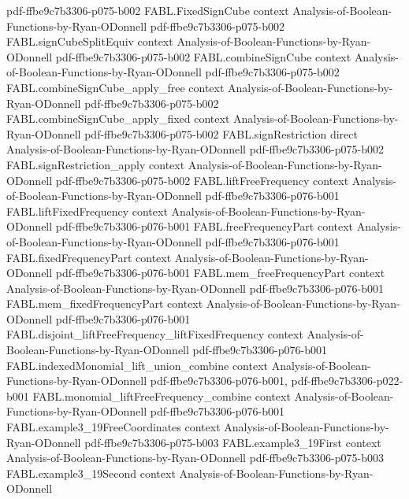 \begin{theorem}
  {pdf-ffbe9c7b3306-p075-b002}
\proofstep
  {FABL.FixedSignCube}
  {context}
  {Analysis-of-Boolean-Functions-by-Ryan-ODonnell}
  {pdf-ffbe9c7b3306-p075-b002}
\proofstep
  {FABL.signCubeSplitEquiv}
  {context}
  {Analysis-of-Boolean-Functions-by-Ryan-ODonnell}
  {pdf-ffbe9c7b3306-p075-b002}
\proofstep
  {FABL.combineSignCube}
  {context}
  {Analysis-of-Boolean-Functions-by-Ryan-ODonnell}
  {pdf-ffbe9c7b3306-p075-b002}
\proofstep
  {FABL.combineSignCube_apply_free}
  {context}
  {Analysis-of-Boolean-Functions-by-Ryan-ODonnell}
  {pdf-ffbe9c7b3306-p075-b002}
\proofstep
  {FABL.combineSignCube_apply_fixed}
  {context}
  {Analysis-of-Boolean-Functions-by-Ryan-ODonnell}
  {pdf-ffbe9c7b3306-p075-b002}
\proofstep
  {FABL.signRestriction}
  {direct}
  {Analysis-of-Boolean-Functions-by-Ryan-ODonnell}
  {pdf-ffbe9c7b3306-p075-b002}
\proofstep
  {FABL.signRestriction_apply}
  {context}
  {Analysis-of-Boolean-Functions-by-Ryan-ODonnell}
  {pdf-ffbe9c7b3306-p075-b002}
\proofstep
  {FABL.liftFreeFrequency}
  {context}
  {Analysis-of-Boolean-Functions-by-Ryan-ODonnell}
  {pdf-ffbe9c7b3306-p076-b001}
\proofstep
  {FABL.liftFixedFrequency}
  {context}
  {Analysis-of-Boolean-Functions-by-Ryan-ODonnell}
  {pdf-ffbe9c7b3306-p076-b001}
\proofstep
  {FABL.freeFrequencyPart}
  {context}
  {Analysis-of-Boolean-Functions-by-Ryan-ODonnell}
  {pdf-ffbe9c7b3306-p076-b001}
\proofstep
  {FABL.fixedFrequencyPart}
  {context}
  {Analysis-of-Boolean-Functions-by-Ryan-ODonnell}
  {pdf-ffbe9c7b3306-p076-b001}
\proofstep
  {FABL.mem_freeFrequencyPart}
  {context}
  {Analysis-of-Boolean-Functions-by-Ryan-ODonnell}
  {pdf-ffbe9c7b3306-p076-b001}
\proofstep
  {FABL.mem_fixedFrequencyPart}
  {context}
  {Analysis-of-Boolean-Functions-by-Ryan-ODonnell}
  {pdf-ffbe9c7b3306-p076-b001}
\proofstep
  {FABL.disjoint_liftFreeFrequency_liftFixedFrequency}
  {context}
  {Analysis-of-Boolean-Functions-by-Ryan-ODonnell}
  {pdf-ffbe9c7b3306-p076-b001}
\proofstep
  {FABL.indexedMonomial_lift_union_combine}
  {context}
  {Analysis-of-Boolean-Functions-by-Ryan-ODonnell}
  {pdf-ffbe9c7b3306-p076-b001,
    pdf-ffbe9c7b3306-p022-b001}
\proofstep
  {FABL.monomial_liftFreeFrequency_combine}
  {context}
  {Analysis-of-Boolean-Functions-by-Ryan-ODonnell}
  {pdf-ffbe9c7b3306-p076-b001}
\proofstep
  {FABL.example3_19FreeCoordinates}
  {context}
  {Analysis-of-Boolean-Functions-by-Ryan-ODonnell}
  {pdf-ffbe9c7b3306-p075-b003}
\proofstep
  {FABL.example3_19First}
  {context}
  {Analysis-of-Boolean-Functions-by-Ryan-ODonnell}
  {pdf-ffbe9c7b3306-p075-b003}
\proofstep
  {FABL.example3_19Second}
  {context}
  {Analysis-of-Boolean-Functions-by-Ryan-ODonnell}

\end{theorem}
